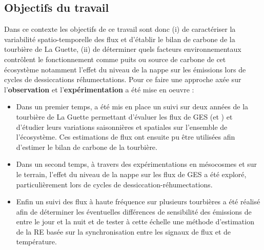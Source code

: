 

\subsection*{Objectifs du travail}
Dans ce contexte les objectifs de ce travail sont donc (i) de caractériser la variabilité spatio-temporelle des flux et d'établir le bilan de carbone de la tourbière de La Guette, (ii) de déterminer quels facteurs environnementaux contrôlent le fonctionnement comme puits ou source de carbone de cet écosystème notamment l'effet du niveau de la nappe sur les émissions lors de cycles de dessiccations réhumectations.
Pour ce faire une approche axée sur l'\textbf{observation} et l'\textbf{expérimentation} a été mise en oeuvre : 

%
\begin{itemize}
\item Dans un premier temps, a été mis en place un suivi sur deux années de la tourbière de La Guette permettant d'évaluer les flux de GES (\coo et \chh) et d'étudier leurs variations saisonnières et spatiales sur l'ensemble de l'écosystème. Ces estimations de flux ont ensuite pu être utilisées afin d'estimer le bilan de carbone de la tourbière.
\item Dans un second temps, à travers des expérimentations en mésocosmes et sur le terrain, l'effet du niveau de la nappe sur les flux de GES a été exploré, particulièrement lors de cycles de dessiccation-réhumectations.
\item Enfin un suivi des flux à haute fréquence sur plusieurs tourbières a été réalisé afin de déterminer les éventuelles différences de sensibilité des émissions de \coo entre le jour et la nuit et de tester à cette échelle une méthode d'estimation de la RE basée sur la synchronisation entre les signaux de flux et de température.
\end{itemize}



